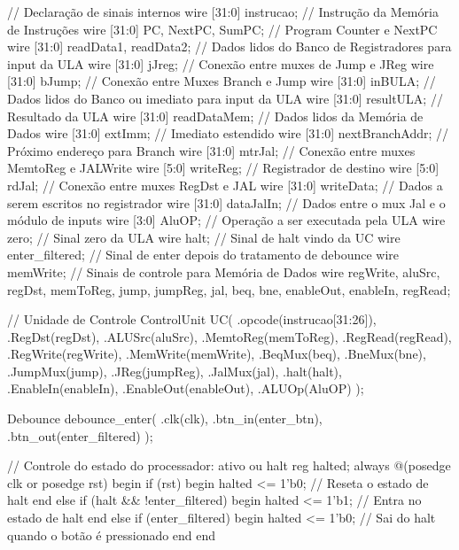 \documentclass[
	12pt,				%
	openright,			%
	a4paper,			%
	english,			%
	french,				%
	spanish,			%
	brazil,				%
	]{abntex2}
\begin{document}
    // Declaração de sinais internos
    wire [31:0] instrucao;            // Instrução da Memória de Instruções
    wire [31:0] PC, NextPC, SumPC;    // Program Counter e NextPC
    wire [31:0] readData1, readData2; // Dados lidos do Banco de Registradores para input da ULA
	 wire [31:0] jJreg;					  // Conexão entre muxes de Jump e JReg
	 wire [31:0] bJump;					  // Conexão entre Muxes Branch e Jump
	 wire [31:0] inBULA;					  // Dados lidos do Banco ou imediato para input da ULA
    wire [31:0] resultULA;            // Resultado da ULA
    wire [31:0] readDataMem;          // Dados lidos da Memória de Dados
    wire [31:0] extImm;               // Imediato estendido
    wire [31:0] nextBranchAddr;       // Próximo endereço para Branch
	 wire [31:0] mtrJal;					  // Conexão entre muxes MemtoReg e JALWrite
    wire [5:0] writeReg;              // Registrador de destino
	 wire [5:0] rdJal;					  // Conexão entre muxes RegDst e JAL
    wire [31:0] writeData;            // Dados a serem escritos no registrador
	 wire [31:0] dataJalIn;				  // Dados entre o mux Jal e o módulo de inputs
    wire [3:0] AluOP;                 // Operação a ser executada pela ULA
    wire zero;                        // Sinal zero da ULA
	 wire halt;								  // Sinal de halt vindo da UC
	 wire enter_filtered;				  // Sinal de enter depois do tratamento de debounce
    wire memWrite;        			     // Sinais de controle para Memória de Dados
    wire regWrite, aluSrc, regDst, memToReg, jump, jumpReg, jal, beq, bne, enableOut, enableIn, regRead;

    // Unidade de Controle
    ControlUnit UC(
        .opcode(instrucao[31:26]),
        .RegDst(regDst),              
        .ALUSrc(aluSrc),              
        .MemtoReg(memToReg),
        .RegRead(regRead),                   
        .RegWrite(regWrite),                      
        .MemWrite(memWrite),          
        .BeqMux(beq),                 
        .BneMux(bne),                 
        .JumpMux(jump),               
        .JReg(jumpReg),               
        .JalMux(jal),
		  .halt(halt),
		  .EnableIn(enableIn),
		  .EnableOut(enableOut),
        .ALUOp(AluOP)                 
    );
	 
	 Debounce debounce_enter(
		  .clk(clk),
		  .btn_in(enter_btn),
		  .btn_out(enter_filtered)
	 );
	 
	 // Controle do estado do processador: ativo ou halt
    reg halted;
    always @(posedge clk or posedge rst) begin
        if (rst) begin
            halted <= 1'b0; // Reseta o estado de halt
        end else if (halt && !enter_filtered) begin
            halted <= 1'b1; // Entra no estado de halt
        end else if (enter_filtered) begin
            halted <= 1'b0; // Sai do halt quando o botão é pressionado
        end
    end
\end{document}
